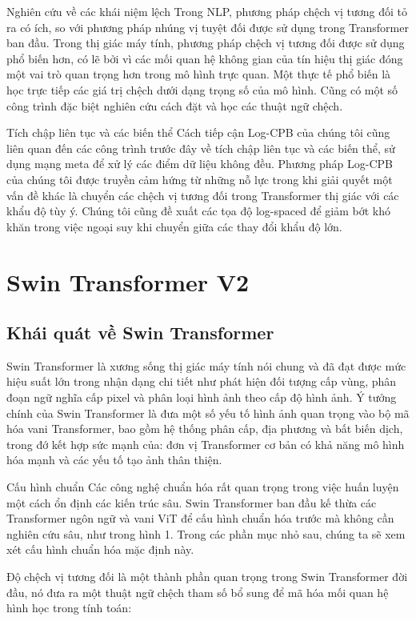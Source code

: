 \documentclass[times, twoside]{zHenriquesLab-StyleBioRxiv}
\begin{document}
Nghiên cứu về các khái niệm lệch Trong NLP, phương pháp chệch vị tương đối tỏ ra có ích, so với phương pháp nhúng vị tuyệt đối được sử dụng trong Transformer ban đầu. Trong thị giác máy tính, phương pháp chệch vị tương đối được sử dụng phổ biến hơn, có lẽ bởi vì các mối quan hệ không gian của tín hiệu thị giác đóng một vai trò quan trọng hơn trong mô hình trực quan. Một thực tế phổ biến là học trực tiếp các giá trị chệch dưới dạng trọng số của mô hình. Cũng có một số công trình đặc biệt nghiên cứu cách đặt và học các thuật ngữ chệch.

Tích chập liên tục và các biến thể Cách tiếp cận Log-CPB của chúng tôi cũng liên quan đến các công trình trước đây về tích chập liên tục và các biến thể, sử dụng mạng meta để xử lý các điểm dữ liệu không đều. Phương pháp Log-CPB của chúng tôi được truyền cảm hứng từ những nỗ lực trong khi giải quyết một vấn đề khác là chuyển các chệch vị tương đối trong Transformer thị giác với các khẩu độ tùy ý. Chúng tôi cũng đề xuất các tọa độ log-spaced để giảm bớt khó khăn trong việc ngoại suy khi chuyển giữa các thay đổi khẩu độ lớn.

\section*{Swin Transformer V2}
\subsection*{Khái quát về Swin Transformer}
Swin Transformer là xương sống thị giác máy tính nói chung và đã đạt được mức hiệu suất lớn trong nhận dạng chi tiết như phát hiện đối tượng cấp vùng, phân đoạn ngữ nghĩa cấp pixel và phân loại hình ảnh theo cấp độ hình ảnh. Ý tưởng chính của Swin Transformer là đưa một số yếu tố hình ảnh quan trọng vào bộ mã hóa vani Transformer, bao gồm hệ thống phân cấp, địa phương và bất biến dịch, trong đớ kết hợp sức mạnh của: đơn vị Transformer cơ bản có khả năng mô hình hóa mạnh và các yếu tố tạo ảnh thân thiện.

Cấu hình chuẩn Các công nghệ chuẩn hóa rất quan trọng trong việc huấn luyện một cách ổn định các kiến trúc sâu. Swin Transformer ban đầu kế thừa các Transformer ngôn ngữ và vani ViT để cấu hình chuẩn hóa trước mà không cần nghiên cứu sâu, như trong hình 1. Trong các phần mục nhỏ sau, chúng ta sẽ xem xét cấu hình chuẩn hóa mặc định này.

Độ chệch vị tương đối là một thành phần quan trọng trong Swin Transformer đời đầu, nó đưa ra một thuật ngữ chệch tham số bổ sung để mã hóa mối quan hệ hình học trong tính toán:
\end{document}
